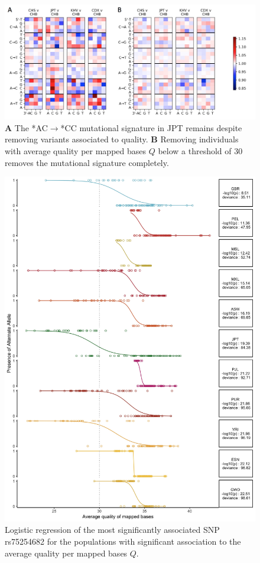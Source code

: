 \documentclass[9pt,lineno]{elife}
\begin{document}
\begin{figure}[h]
\includegraphics[width=\hsize,keepaspectratio]{./Figures/MutationSpectrum_cutOff.png}
\caption{\textbf{A} 
The  *AC${\rightarrow}$*CC mutational signature in JPT remains despite removing variants associated to quality. 
\textbf{B} 
Removing individuals with average quality per mapped bases $Q$ below a threshold of 30 removes the mutational signature completely. }
\label{MutSpect}
\end{figure}

\begin{figure}[h]
\includegraphics[width=\hsize,keepaspectratio]{./Figures/RegressionPlot_mostSig2.jpg}
\caption{Logistic regression of the most significantly associated SNP rs75254682 for the populations with significant association to the average quality per mapped bases $Q$.}
\label{MostSig}
\end{figure}
\end{document}
